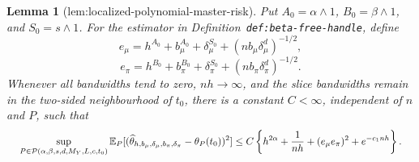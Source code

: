 \documentclass{article}
\newtheorem{lemma}{Lemma}
\begin{document}
\begin{lemma}[lem:localized-polynomial-master-risk]\label{lem:localized-polynomial-master-risk}
Put \(A_0=\alpha\wedge1\), \(B_0=\beta\wedge1\), and \(S_0=s\wedge1\). For the estimator in Definition~\texttt{def:beta-free-handle}, define
\[
e_\mu=h^{A_0}+b_\mu^{A_0}+\delta_\mu^{S_0}+(nb_\mu\delta_\mu^d)^{-1/2},
\]
\[
e_\pi=h^{B_0}+b_\pi^{B_0}+\delta_\pi^{S_0}+(nb_\pi\delta_\pi^d)^{-1/2}.
\]
Whenever all bandwidths tend to zero, \(nh\to\infty\), and the slice bandwidths remain in the two-sided neighbourhood of \(t_0\), there is a constant \(C<\infty\), independent of \(n\) and \(P\), such that
\[
\makebox[\linewidth][c]{\resizebox{0.98\linewidth}{!}{\(\displaystyle \sup_{P\in\mathcal P(\alpha,\beta,s,d,M_Y,L,c,t_0)}
\mathbb E_P[(\widehat\theta_{h,b_\mu,\delta_\mu,b_\pi,\delta_\pi}-\theta_P(t_0))^2]
\le C\left\{h^{2\alpha}+\frac1{nh}+(e_\mu e_\pi)^2+e^{-c_1nh}\right\}.\)}}
\]
\end{lemma}
\end{document}
